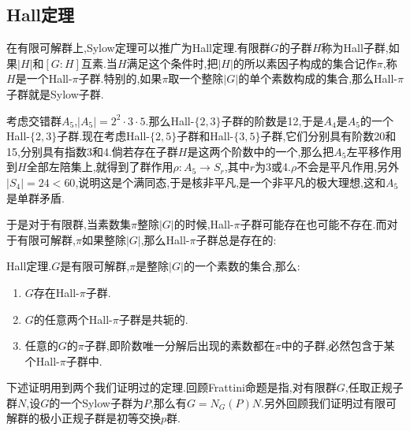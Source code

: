 \newpage
\subsection{Hall定理}

在有限可解群上,Sylow定理可以推广为Hall定理.有限群$G$的子群$H$称为Hall子群,如果$|H|$和$[G:H]$互素.当$H$满足这个条件时,把$|H|$的所以素因子构成的集合记作$\pi$,称$H$是一个Hall-$\pi$子群.特别的,如果$\pi$取一个整除$|G|$的单个素数构成的集合,那么Hall-$\pi$子群就是Sylow子群.

考虑交错群$A_5$,$|A_5|=2^2\cdot3\cdot5$.那么Hall-$\{2,3\}$子群的阶数是12,于是$A_4$是$A_5$的一个Hall-$\{2,3\}$子群.现在考虑Hall-$\{2,5\}$子群和Hall-$\{3,5\}$子群,它们分别具有阶数20和15,分别具有指数3和4.倘若存在子群$H$是这两个阶数中的一个,那么把$A_5$左平移作用到$H$全部左陪集上,就得到了群作用$\rho:A_5\to S_r$,其中$r$为3或4.$\rho$不会是平凡作用,另外$|S_4|=24<60$,说明这是个满同态,于是核非平凡,是一个非平凡的极大理想,这和$A_5$是单群矛盾.

于是对于有限群,当素数集$\pi$整除$|G|$的时候,Hall-$\pi$子群可能存在也可能不存在.而对于有限可解群,$\pi$如果整除$|G|$,那么Hall-$\pi$子群总是存在的:

Hall定理.$G$是有限可解群,$\pi$是整除$|G|$的一个素数的集合,那么:
\begin{enumerate}
	\item $G$存在Hall-$\pi$子群.
	\item $G$的任意两个Hall-$\pi$子群是共轭的.
	\item 任意的$G$的$\pi$子群,即阶数唯一分解后出现的素数都在$\pi$中的子群,必然包含于某个Hall-$\pi$子群中.
\end{enumerate}

下述证明用到两个我们证明过的定理.回顾Frattini命题是指,对有限群$G$,任取正规子群$N$,设$G$的一个Sylow子群为$P$,那么有$G=N_G(P)N$.另外回顾我们证明过有限可解群的极小正规子群是初等交换$p$群.

